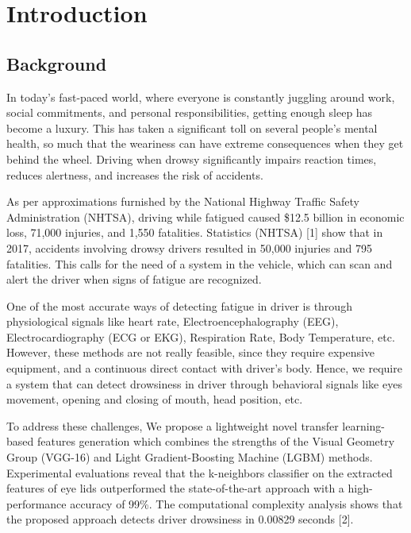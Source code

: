 \documentclass[a4paper,12pt]{report}
\begin{document}
\onehalfspacing

\chapter{Introduction}

\section{Background}

In today's fast-paced world, where everyone is constantly juggling  around work, social commitments, and personal responsibilities, getting enough sleep has become a luxury. This has taken a significant toll on several people's mental health, so much that the weariness can have extreme consequences when they get behind the wheel. Driving when drowsy significantly impairs reaction times, reduces alertness, and increases the risk of accidents.

As per approximations furnished by the National Highway Traffic Safety Administration (NHTSA), driving while fatigued caused \$12.5 billion in economic loss, 71,000 injuries, and 1,550 fatalities. Statistics (NHTSA) [1] show that in 2017, accidents involving drowsy drivers resulted in 50,000 injuries and 795 fatalities. This calls for the need of a system in the vehicle, which can scan and alert the driver when signs of fatigue are recognized.

One of the most accurate ways of detecting fatigue in driver is through physiological signals like heart rate, Electroencephalography (EEG), Electrocardiography (ECG or EKG), Respiration Rate, Body Temperature, etc. However, these methods are not really feasible, since they require expensive equipment, and a continuous direct contact with driver's body. Hence, we require a system that can detect drowsiness in driver through behavioral signals like eyes movement, opening and closing of mouth, head position, etc. 

To address these challenges, We propose a lightweight novel transfer learning-based features generation which combines the strengths of the Visual Geometry Group (VGG-16) and Light Gradient-Boosting Machine (LGBM) methods. Experimental evaluations reveal that the k-neighbors classifier on the extracted features of eye lids outperformed the state-of-the-art approach with a high-performance accuracy of 99\%. The computational complexity analysis shows that the proposed approach detects driver drowsiness in 0.00829 seconds [2].
\end{document}
